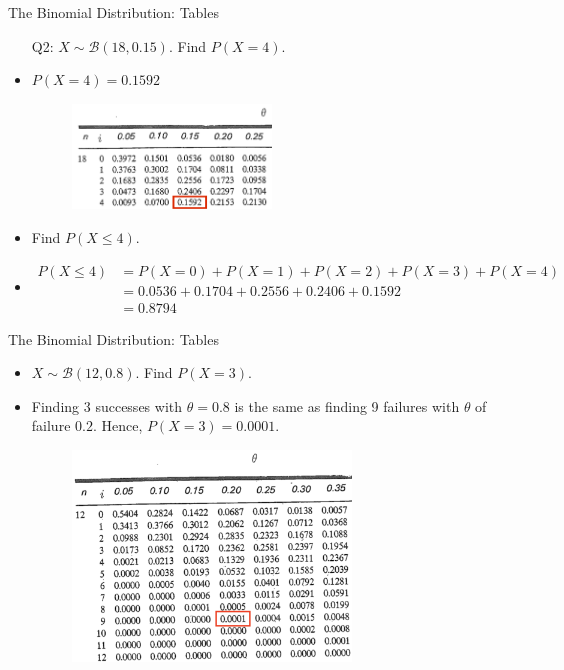 \documentclass[10pt, handout, xcolor=table]{beamer}
\begin{document}
\begin{frame}{The Binomial Distribution: Tables}
\begin{itemize}
\setlength{\itemsep}{6pt}
\item[Q2:] $X\sim \mathcal{B}(18, 0.15)$. Find $P(X = 4)$.
\item<2->[A2:] {\color{red} $P(X = 4) = 0.1592$}
\begin{figure}
\includegraphics[width = 0.5\textwidth]{images/rec2_1}
\end{figure}
\item<3->[Q3:] Find $P(X \leq 4)$.
\item<4->[A3:] {\color{red} 
\begin{align*}
P(X \leq 4) &= P(X= 0) + P(X=1)+P(X=2)+P(X=3)+P(X=4) \\
&= 0.0536 + 0.1704 + 0.2556 + 0.2406 + 0.1592 \\
&= 0.8794
\end{align*}}
\end{itemize}
\end{frame}

\begin{frame}{The Binomial Distribution: Tables}
\begin{itemize}
\setlength{\itemsep}{6pt}
\item<1->[Q2:] $X\sim \mathcal{B}(12, 0.8)$. Find $P(X = 3)$.
\item<2->[A2:] \color{red} Finding 3 successes with $\theta = 0.8$ is the same as finding 9 failures with $\theta$ of failure $0.2$. Hence, $P(X = 3) = 0.0001$.
\begin{figure}
\includegraphics[width = 0.7\textwidth]{images/rec2_2}
\end{figure}
\end{itemize}
\end{frame}
\end{document}
